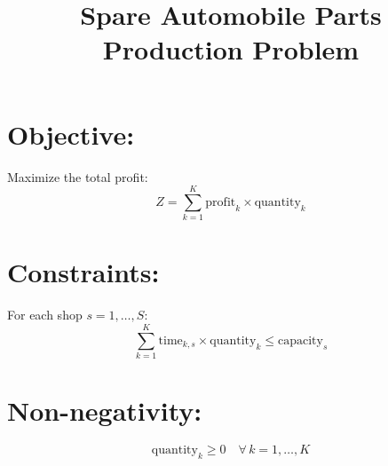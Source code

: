 \documentclass{article}
\begin{document}
\title{Spare Automobile Parts Production Problem}
\author{}
\date{}
\maketitle

\section*{Objective:}
Maximize the total profit:
\begin{equation}
Z = \sum_{k=1}^{K} \text{profit}_k \times \text{quantity}_k
\end{equation}

\section*{Constraints:}

For each shop \(s = 1, \ldots, S\):
\begin{equation}
\sum_{k=1}^{K} \text{time}_{k, s} \times \text{quantity}_k \leq \text{capacity}_s
\end{equation}

\section*{Non-negativity:}
\begin{equation}
\text{quantity}_k \geq 0 \quad \forall \, k = 1, \ldots, K
\end{equation}
\end{document}
